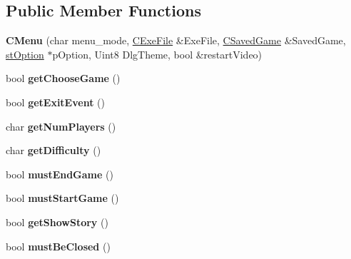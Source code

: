 \subsection*{Public Member Functions}
\begin{DoxyCompactItemize}
\item 
\hypertarget{class_c_menu_adb00653806cbf130f5f05aa9bd194d6a}{
{\bfseries CMenu} (char menu\_\-mode, \hyperlink{class_c_exe_file}{CExeFile} \&ExeFile, \hyperlink{class_c_saved_game}{CSavedGame} \&SavedGame, \hyperlink{structst_option}{stOption} $\ast$pOption, Uint8 DlgTheme, bool \&restartVideo)}
\label{class_c_menu_adb00653806cbf130f5f05aa9bd194d6a}

\item 
\hypertarget{class_c_menu_a215f18a0f89fd6b71ea93909f90adc24}{
bool {\bfseries getChooseGame} ()}
\label{class_c_menu_a215f18a0f89fd6b71ea93909f90adc24}

\item 
\hypertarget{class_c_menu_a65a9c0de5256679ec487bdcfe71d9749}{
bool {\bfseries getExitEvent} ()}
\label{class_c_menu_a65a9c0de5256679ec487bdcfe71d9749}

\item 
\hypertarget{class_c_menu_abe800ae3677bf1771f7815aa6993f812}{
char {\bfseries getNumPlayers} ()}
\label{class_c_menu_abe800ae3677bf1771f7815aa6993f812}

\item 
\hypertarget{class_c_menu_ae50aa1e3c8dff7353665adae06a0ca86}{
char {\bfseries getDifficulty} ()}
\label{class_c_menu_ae50aa1e3c8dff7353665adae06a0ca86}

\item 
\hypertarget{class_c_menu_a998f9338500c1c7f08a8ad9cfd70bfdc}{
bool {\bfseries mustEndGame} ()}
\label{class_c_menu_a998f9338500c1c7f08a8ad9cfd70bfdc}

\item 
\hypertarget{class_c_menu_ac605e6afd566fd77d71c0a3baa7af150}{
bool {\bfseries mustStartGame} ()}
\label{class_c_menu_ac605e6afd566fd77d71c0a3baa7af150}

\item 
\hypertarget{class_c_menu_a9fb65b8075dce3a501b708d748792508}{
bool {\bfseries getShowStory} ()}
\label{class_c_menu_a9fb65b8075dce3a501b708d748792508}

\item 
\hypertarget{class_c_menu_a46375ad01be94e3a2b8faf10b664958e}{
bool {\bfseries mustBeClosed} ()}
\label{class_c_menu_a46375ad01be94e3a2b8faf10b664958e}


\end{DoxyCompactItemize}
